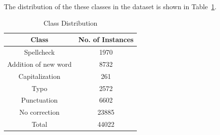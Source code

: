 \documentclass[letterpaper]{article}
\begin{document}
\begin{enumerate}
\begin{itemize}
The distribution of the these classes in the dataset is shown in Table~\ref{table: classes}.

\begin{table}[htdp]
\begin{center}
\begin{tabular}{| c | c |}
\hline
 Class  & No. of Instances \\
\hline
 Spellcheck & 1970 \\
 Addition of new word & 8732 \\
 Capitalization & 261 \\
Typo & 2572 \\
Punctuation & 6602 \\
No correction & 23885 \\
\hline
Total & 44022 \\
\hline
\end{tabular}
\end{center}
\caption{Class Distribution}
\label{table: classes}
\end{table}

\end{itemize}






%



\end{enumerate}
\end{document}
